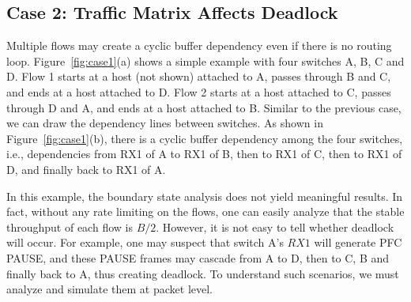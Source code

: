 \subsection{Case 2: Traffic Matrix Affects Deadlock}

Multiple flows may create a cyclic buffer dependency even if there is no routing loop.
Figure~\ref{fig:case1}(a) shows a simple example with four switches A, B, C and D. 
Flow 1 starts at a host (not shown) attached to A, passes through B and C, and ends at a 
host attached to D. Flow 2 starts at a host attached to C, passes through D and A, and 
ends at a host attached to B.
Similar to the previous case, we can draw the dependency lines between switches. As shown in 
Figure~\ref{fig:case1}(b), there is a cyclic buffer dependency among the four switches, i.e., 
dependencies from RX1 of A to RX1 of B, then to RX1 of C, then to RX1 of D, and finally back to RX1 of A.


In this example, the boundary state analysis does not yield meaningful
results. In fact, without any rate limiting on the flows, one can easily analyze that the 
stable throughput of each flow is $B/2$. However, it is not easy to tell whether deadlock 
will occur. For example, one may suspect that switch A's $RX1$ will generate PFC PAUSE, and 
these PAUSE frames may cascade from A to D, then to C, B and finally back to A, thus creating deadlock.
To understand such scenarios, we must analyze and simulate them at packet level.


